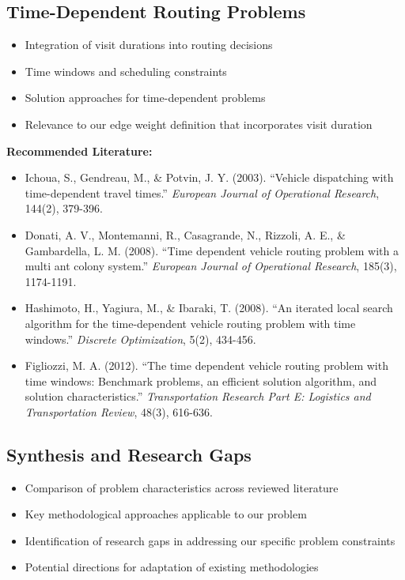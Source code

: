\subsection{Time-Dependent Routing Problems}
\begin{itemize}
    \item Integration of visit durations into routing decisions
    \item Time windows and scheduling constraints
    \item Solution approaches for time-dependent problems
    \item Relevance to our edge weight definition that incorporates visit duration
\end{itemize}

\noindent\textbf{Recommended Literature:}
\begin{itemize}
    \item Ichoua, S., Gendreau, M., \& Potvin, J. Y. (2003). ``Vehicle dispatching with time-dependent travel times.'' \textit{European Journal of Operational Research}, 144(2), 379-396.
    \item Donati, A. V., Montemanni, R., Casagrande, N., Rizzoli, A. E., \& Gambardella, L. M. (2008). ``Time dependent vehicle routing problem with a multi ant colony system.'' \textit{European Journal of Operational Research}, 185(3), 1174-1191.
    \item Hashimoto, H., Yagiura, M., \& Ibaraki, T. (2008). ``An iterated local search algorithm for the time-dependent vehicle routing problem with time windows.'' \textit{Discrete Optimization}, 5(2), 434-456.
    \item Figliozzi, M. A. (2012). ``The time dependent vehicle routing problem with time windows: Benchmark problems, an efficient solution algorithm, and solution characteristics.'' \textit{Transportation Research Part E: Logistics and Transportation Review}, 48(3), 616-636.
\end{itemize}

\subsection{Synthesis and Research Gaps}
\begin{itemize}
    \item Comparison of problem characteristics across reviewed literature
    \item Key methodological approaches applicable to our problem
    \item Identification of research gaps in addressing our specific problem constraints
    \item Potential directions for adaptation of existing methodologies
\end{itemize}

